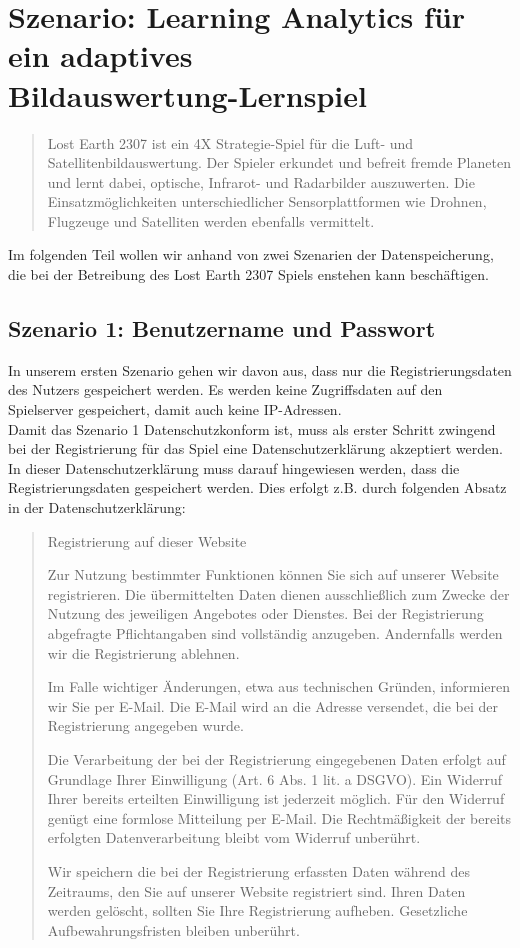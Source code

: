 \documentclass[a4paper, 12pt]{article}
\begin{document}
\section{Szenario: Learning Analytics für ein adaptives \\Bildauswertung-Lernspiel}


\begin{quote}Lost Earth 2307 ist ein 4X Strategie-Spiel für die Luft- und Satellitenbildauswertung. Der Spieler erkundet und befreit fremde Planeten und lernt dabei, optische, Infrarot- und Radarbilder auszuwerten. Die Einsatzmöglichkeiten unterschiedlicher Sensorplattformen wie Drohnen, Flugzeuge und Satelliten werden ebenfalls vermittelt. \cite{lostearth}
\end{quote}
Im folgenden Teil wollen wir anhand von zwei Szenarien der Datenspeicherung, die bei der Betreibung des  Lost Earth 2307 Spiels enstehen kann beschäftigen. 

\subsection{Szenario 1: Benutzername und Passwort}
In unserem ersten Szenario gehen wir davon aus, dass nur die Registrierungsdaten des Nutzers gespeichert werden. Es werden keine Zugriffsdaten auf den Spielserver gespeichert, damit auch keine IP-Adressen.\\

\noindent Damit das Szenario 1 Datenschutzkonform ist, muss als erster Schritt zwingend bei der Registrierung für das Spiel eine Datenschutzerklärung akzeptiert werden.
In dieser Datenschutzerklärung muss darauf hingewiesen werden, dass die Registrierungsdaten gespeichert werden. Dies erfolgt z.B. durch folgenden Absatz in der Datenschutzerklärung: 
\begin{quote}
Registrierung auf dieser Website

Zur Nutzung bestimmter Funktionen können Sie sich auf unserer Website registrieren. Die übermittelten Daten dienen ausschließlich zum Zwecke der Nutzung des jeweiligen Angebotes oder Dienstes. Bei der Registrierung abgefragte Pflichtangaben sind vollständig anzugeben. Andernfalls werden wir die Registrierung ablehnen.

Im Falle wichtiger Änderungen, etwa aus technischen Gründen, informieren wir Sie per E-Mail. Die E-Mail wird an die Adresse versendet, die bei der Registrierung angegeben wurde.

Die Verarbeitung der bei der Registrierung eingegebenen Daten erfolgt auf Grundlage Ihrer Einwilligung (Art. 6 Abs. 1 lit. a DSGVO). Ein Widerruf Ihrer bereits erteilten Einwilligung ist jederzeit möglich. Für den Widerruf genügt eine formlose Mitteilung per E-Mail. Die Rechtmäßigkeit der bereits erfolgten Datenverarbeitung bleibt vom Widerruf unberührt.

Wir speichern die bei der Registrierung erfassten Daten während des Zeitraums, den Sie auf unserer Website registriert sind. Ihren Daten werden gelöscht, sollten Sie Ihre Registrierung aufheben. Gesetzliche Aufbewahrungsfristen bleiben unberührt.
\end{quote}
\end{document}
